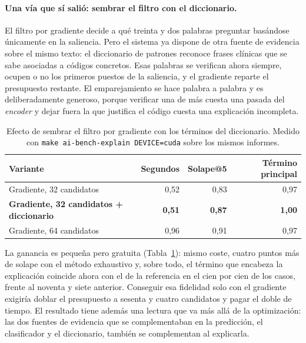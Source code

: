 \paragraph{Una vía que sí salió: sembrar el filtro con el diccionario.}
El filtro por gradiente decide a qué treinta y dos palabras preguntar basándose únicamente en la saliencia. Pero el sistema ya dispone de otra fuente de evidencia sobre el mismo texto: el diccionario de patrones reconoce frases clínicas que se sabe asociadas a códigos concretos. Esas palabras se verifican ahora siempre, ocupen o no los primeros puestos de la saliencia, y el gradiente reparte el presupuesto restante. El emparejamiento se hace palabra a palabra y es deliberadamente generoso, porque verificar una de más cuesta una pasada del \emph{encoder} y dejar fuera la que justifica el código cuesta una explicación incompleta.

\begin{table}[h]
\centering
\small
\caption{Efecto de sembrar el filtro por gradiente con los términos del diccionario. Medido con \texttt{make ai-bench-explain DEVICE=cuda} sobre los mismos informes.}
\label{tab:explain-diccionario}
\begin{tabular}{lrrr}
\hline
\textbf{Variante} & \textbf{Segundos} & \textbf{Solape@5} & \textbf{Término principal} \\
\hline
Gradiente, 32 candidatos & 0{,}52 & 0{,}83 & 0{,}97 \\
\rowcolor{gray!15}
\textbf{Gradiente, 32 candidatos + diccionario} & \textbf{0{,}51} & \textbf{0{,}87} & \textbf{1{,}00} \\
Gradiente, 64 candidatos & 0{,}96 & 0{,}91 & 0{,}97 \\
\hline
\end{tabular}
\end{table}

La ganancia es pequeña pero gratuita (Tabla~\ref{tab:explain-diccionario}): mismo coste, cuatro puntos más de solape con el método exhaustivo y, sobre todo, el término que encabeza la explicación coincide ahora con el de la referencia en el cien por cien de los casos, frente al noventa y siete anterior. Conseguir esa fidelidad solo con el gradiente exigiría doblar el presupuesto a sesenta y cuatro candidatos y pagar el doble de tiempo. El resultado tiene además una lectura que va más allá de la optimización: las dos fuentes de evidencia que se complementaban en la predicción, el clasificador y el diccionario, también se complementan al explicarla.

